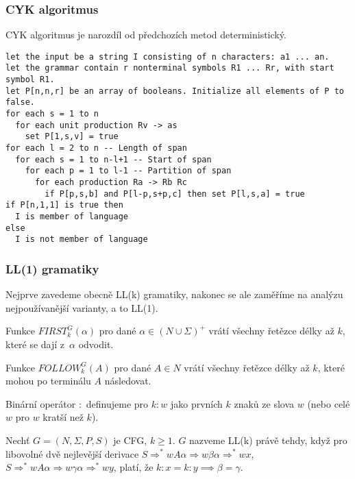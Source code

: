 \begin{example}
\end{example}


\subsubsection{CYK algoritmus}

CYK algoritmus je narozdíl od předchozích metod deterministický.

\begin{Verbatim}[fontsize=\small]
let the input be a string I consisting of n characters: a1 ... an.
let the grammar contain r nonterminal symbols R1 ... Rr, with start symbol R1.
let P[n,n,r] be an array of booleans. Initialize all elements of P to false.
for each s = 1 to n
  for each unit production Rv -> as
    set P[1,s,v] = true
for each l = 2 to n -- Length of span
  for each s = 1 to n-l+1 -- Start of span
    for each p = 1 to l-1 -- Partition of span
      for each production Ra -> Rb Rc
        if P[p,s,b] and P[l-p,s+p,c] then set P[l,s,a] = true
if P[n,1,1] is true then
  I is member of language
else
  I is not member of language
\end{Verbatim}

\subsubsection{LL(1) gramatiky}


Nejprve zavedeme obecně LL(k) gramatiky, nakonec se ale zaměříme na
analýzu nejpoužívanější varianty, a to LL(1).

\begin{definition}
    Funkce $FIRST^G_k(\alpha)$ pro dané $\alpha \in (N \cup \Sigma)^+$
    vrátí všechny řetězce délky až $k$, které se dají z~$\alpha$
    odvodit.

    Funkce $FOLLOW^G_k(A)$ pro dané $A \in N$
    vrátí všechny řetězce délky až $k$, které mohou po terminálu $A$
    následovat.

    Binární operátor ${:}$ definujeme pro $k : w$ jako prvních $k$ znaků
    ze slova $w$ (nebo celé $w$ pro $w$ kratší než $k$).
\end{definition}

\begin{definition}
    Nechť $G = (N, \Sigma, P, S)$ je CFG, $k \geq 1$. $G$ nazveme LL(k)
    právě tehdy, když pro libovolné dvě nejlevější derivace
    $S \Rightarrow^* wA\alpha \Rightarrow w\beta\alpha \Rightarrow^* wx$,
    $S \Rightarrow^* wA\alpha \Rightarrow w\gamma\alpha \Rightarrow^* wy$,
    platí, že $k : x = k : y \implies \beta = \gamma$.
\end{definition}

